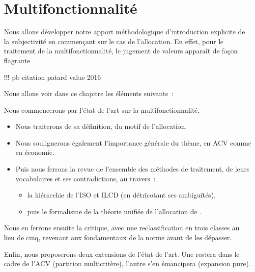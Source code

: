 \chapter{Multifonctionnalité}
\label{chap:Multifonctionnalité}

Nous allons développer notre apport méthodologique d'introduction explicite de la subjectivité en commençant sur le cas de l'allocation.
En effet, pour le traitement de la multifonctionnalité, le jugement de valeurs apparaît de façon flagrante

!!! pb citation patard value 2016

Nous allons voir dans ce chapitre les éléments suivants~:
\begin{description}
\item Nous commencerons par l'état de l'art sur la multifonctionnalité,
	\begin{itemize}
	\item Nous traiterons de sa définition, du motif de l'allocation.
	\item Nous soulignerons également l'importance générale du thème, en ACV comme en économie.
	\item Puis nous ferrons la revue de l'ensemble des méthodes de traitement, de leurs vocabulaires et ses contradictions, au travers~:
		\begin{itemize}
		\item la hiérarchie de l'ISO et ILCD (en détricotant ses ambiguïtés),
		\item puis le formalisme de la théorie unifiée de l'allocation de \citeauthor{majeau-bettez_unified_2014}.
		\end{itemize}
	\end{itemize} 
\item Nous en ferrons ensuite la critique, avec une reclassification en trois classes au lieu de cinq, revenant aux fondamentaux de la norme avant de les dépasser.
\item Enfin, nous proposerons deux extensions de l'état de l'art.
Une restera dans le cadre de l'ACV (partition multicritère), l'autre s'en émancipera (expansion pure).
\end{description}

